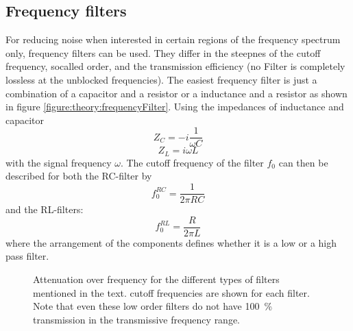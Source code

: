             \subsection{Frequency filters}
            For reducing noise when interested in certain regions of the frequency spectrum only, frequency filters can be used. They differ in the steepnes of the cutoff frequency, socalled order, and the transmission efficiency (no Filter is completely lossless at the unblocked frequencies). The easiest frequency filter is just a combination of a capacitor and a resistor or a inductance and a resistor as shown in figure \ref{figure:theory:frequencyFilter}. Using the impedances of inductance and capacitor
                \begin{equation*}
                    Z_C = -i\frac{1}{\omega C}
                \end{equation*}
                \begin{equation*}
                    Z_L = {i\omega L}
                \end{equation*} 
                with the signal frequency $\omega$. The cutoff frequency of the filter $f_0$ can then be described for both the RC-filter by
                \begin{equation}
                    f_0^{RC} = \frac{1}{2\pi R C}
                \end{equation}
                and the RL-filters:
                \begin{equation}
                    f_0^{RL} = \frac{R}{2\pi L}
                \end{equation}
            where the arrangement of the components defines whether it is a low or a high pass filter.
            \begin{figure}
                \caption[Frequency filters]{Attenuation over frequency for the different types of filters mentioned in the text. cutoff frequencies are shown for each filter. Note that even these low order filters do not have \SI{100}{\percent} transmission in the transmissive frequency range.}
            \end{figure}
